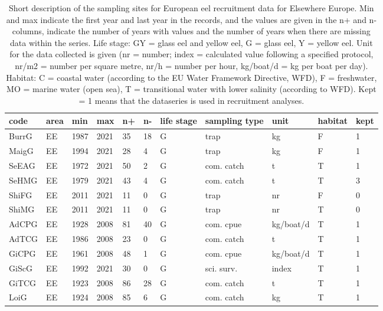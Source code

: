 \begin{table}[ht]
\centering
\caption{Short description of the sampling sites for European eel recruitment data for Elsewhere Europe. Min and max indicate the first year and last year in the records, and the values are given in the n+ and n- columns, indicate the number of years with values and the number of years when there are missing data within the series. Life stage: GY = glass eel and yellow eel, G = glass eel, Y = yellow eel. Unit for the data collected is given (nr = number; index = calculated value following a specified protocol, nr/m2 = number per square metre, nr/h = number per hour, kg/boat/d = kg per boat per day). Habitat: C = coastal water (according to the EU Water Framework Directive, WFD), F = freshwater, MO = marine water (open sea), T = transitional water with lower salinity (according to WFD). Kept = 1 means that the dataseries is used in recruitment analyses.} 
\label{statseriesG}
\begin{tabular}{p{1cm}p{1cm}p{1cm}p{1cm}p{0.8cm}p{0.8cm}p{1cm}p{2cm}p{2cm}p{1cm}p{1cm}}
  \hline
code & area & min & max & n+ & n- & life stage & sampling type & unit & habitat & kept \\ 
  \hline
BurrG & EE & 1987 & 2021 & 35 & 18 & G & trap & kg & F & 1 \\ 
  MaigG & EE & 1994 & 2021 & 28 & 4 & G & trap & kg & F & 1 \\ 
  SeEAG & EE & 1972 & 2021 & 50 & 2 & G & com. catch & t & T & 1 \\ 
  SeHMG & EE & 1979 & 2021 & 43 & 4 & G & com. catch & t & T & 3 \\ 
  ShiFG & EE & 2011 & 2021 & 11 & 0 & G & trap & nr & F & 0 \\ 
  ShiMG & EE & 2011 & 2021 & 11 & 0 & G & trap & nr & T & 0 \\ 
  AdCPG & EE & 1928 & 2008 & 81 & 40 & G & com. cpue & kg/boat/d & T & 1 \\ 
  AdTCG & EE & 1986 & 2008 & 23 & 0 & G & com. catch & t & T & 1 \\ 
  GiCPG & EE & 1961 & 2008 & 48 & 1 & G & com. cpue & kg/boat/d & T & 1 \\ 
  GiScG & EE & 1992 & 2021 & 30 & 0 & G & sci. surv. & index & T & 1 \\ 
  GiTCG & EE & 1923 & 2008 & 86 & 28 & G & com. catch & t & T & 1 \\ 
  LoiG & EE & 1924 & 2008 & 85 & 6 & G & com. catch & kg & T & 1 \\ 

\end{tabular}
\end{table}
